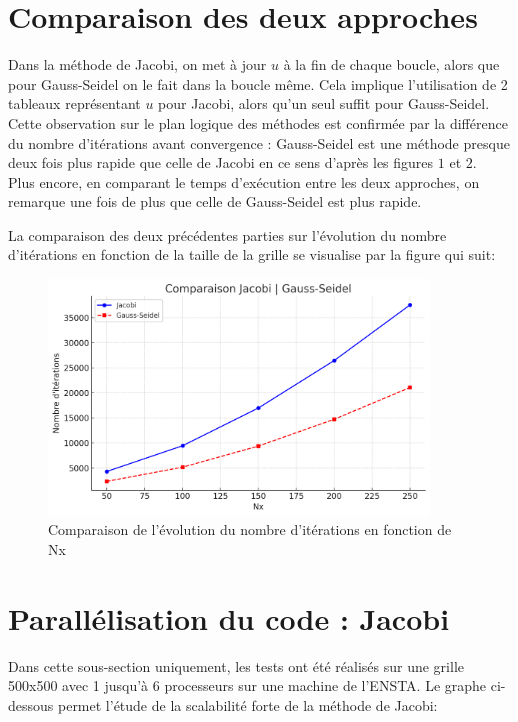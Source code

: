 \documentclass{article}
\begin{document}
\section{Comparaison des deux approches}
Dans la méthode de Jacobi, on met à jour $u$ à la fin de chaque boucle, alors que pour Gauss-Seidel on le fait dans la boucle même. Cela implique l'utilisation de 2 tableaux représentant $u$ pour Jacobi, alors qu'un seul suffit pour Gauss-Seidel.\\
Cette observation sur le plan logique des méthodes est confirmée par la différence du nombre d'itérations avant convergence : Gauss-Seidel est une méthode presque deux fois plus rapide que celle de Jacobi en ce sens d'après les figures $1$ et $2$. \\
Plus encore, en comparant le temps d'exécution entre les deux approches, on remarque une fois de plus que celle de Gauss-Seidel est plus rapide.

La comparaison des deux précédentes parties sur l'évolution du nombre d'itérations en fonction de la taille de la grille se visualise par la figure qui suit:

\begin{figure}[H]
    \centering
    \includegraphics[width=0.9\textwidth]{comparaison_j_gs.png}
    \caption{Comparaison de l'évolution du nombre d'itérations en fonction de Nx}
    \label{fig:comparaison}
\end{figure}

\section{Parallélisation du code : Jacobi}

Dans cette sous-section uniquement, les tests ont été réalisés sur une grille 500x500 avec 1 jusqu'à 6 processeurs sur une machine de l'ENSTA. Le graphe ci-dessous permet l'étude de la scalabilité forte de la méthode de Jacobi:
\end{document}
